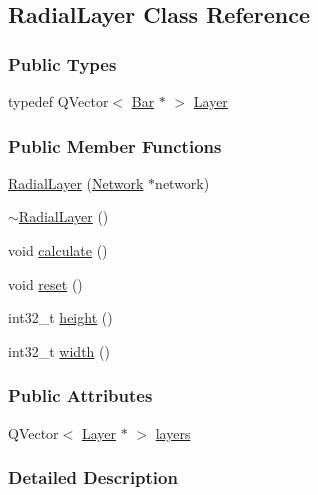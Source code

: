 \hypertarget{class_radial_layer}{}\subsection{Radial\+Layer Class Reference}
\label{class_radial_layer}
\subsubsection*{Public Types}
\begin{DoxyCompactItemize}
\item 
typedef Q\+Vector$<$ \hyperlink{class_bar}{Bar} $\ast$ $>$ \hyperlink{class_radial_layer_a65d67f20b05dd45f90ec4252376807b2}{Layer}
\end{DoxyCompactItemize}
\subsubsection*{Public Member Functions}
\begin{DoxyCompactItemize}
\item 
\hyperlink{class_radial_layer_aed5c263337bbfc88538eeab76ce9843c}{Radial\+Layer} (\hyperlink{class_network}{Network} $\ast$network)
\item 
\hyperlink{class_radial_layer_aa862e21e30909caf8b08e10128efd509}{$\sim$\+Radial\+Layer} ()
\item 
void \hyperlink{class_radial_layer_a971680f24ba6c516afedbc49d8c22cab}{calculate} ()
\item 
void \hyperlink{class_radial_layer_ad7c22136680fe3b188ae023dd619a30f}{reset} ()
\item 
int32\+\_\+t \hyperlink{class_radial_layer_a16baa7c0de325df193117752161b0974}{height} ()
\item 
int32\+\_\+t \hyperlink{class_radial_layer_ae8b32d0711cc6f4dbec832bb07d59a49}{width} ()
\end{DoxyCompactItemize}
\subsubsection*{Public Attributes}
\begin{DoxyCompactItemize}
\item 
Q\+Vector$<$ \hyperlink{class_radial_layer_a65d67f20b05dd45f90ec4252376807b2}{Layer} $\ast$ $>$ \hyperlink{class_radial_layer_a714c36b1ab50a7778953e924ddac2787}{layers}
\end{DoxyCompactItemize}


\subsubsection{Detailed Description}


